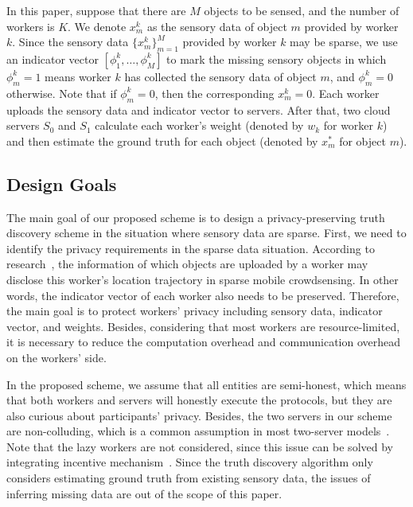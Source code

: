 \documentclass[conference]{IEEEtran}
\begin{document}
In this paper, suppose that there are $M$ objects to be sensed, and the number of workers is $K$.
We denote $x_m^k$ as the sensory data of object $m$ provided by worker $k$.
Since the sensory data $\{x_m^k\}_{m=1}^M$ provided by worker $k$ may be sparse, we use an indicator vector $[\phi_1^k, \ldots, \phi_M^k]$ to mark the missing sensory objects in which $\phi_m^k = 1$ means worker $k$ has collected the sensory data of object $m$, and $\phi_m^k = 0$ otherwise.
Note that if $\phi_m^k = 0$, then the corresponding $x_m^k = 0$.
Each worker uploads the sensory data and indicator vector to servers.
After that, two cloud servers $S_0$ and $S_1$ calculate each worker's weight (denoted by $w_k$ for worker $k$) and then estimate the ground truth for each object (denoted by $x_m^*$ for object $m$). 
\subsection{Design Goals}

The main goal of our proposed scheme is to design a privacy-preserving truth discovery scheme in the situation where sensory data are sparse.
First, we need to identify the privacy requirements in the sparse data situation.
According to research~\cite{wang_sparse_2020}, the information of which objects are uploaded by a worker may disclose this worker's location trajectory in sparse mobile crowdsensing.
In other words, the indicator vector of each worker also needs to be preserved.
Therefore, the main goal is to protect workers' privacy including sensory data, indicator vector, and weights.
Besides, considering that most workers are resource-limited, it is necessary to reduce the computation overhead and communication overhead on the workers' side.

In the proposed scheme, we assume that all entities are semi-honest, which means that both workers and servers will honestly execute the protocols, but they are also curious about participants' privacy.
Besides, the two servers in our scheme are non-colluding, which is a common assumption in most two-server models~\cite{zhang_lptd_2019,zhang_reliable_2019}.
Note that the lazy workers are not considered, since this issue can be solved by integrating incentive mechanism~\cite{xue_inpptd_2020}.
Since the truth discovery algorithm only considers estimating ground truth from existing sensory data, the issues of inferring missing data are out of the scope of this paper.
\end{document}
